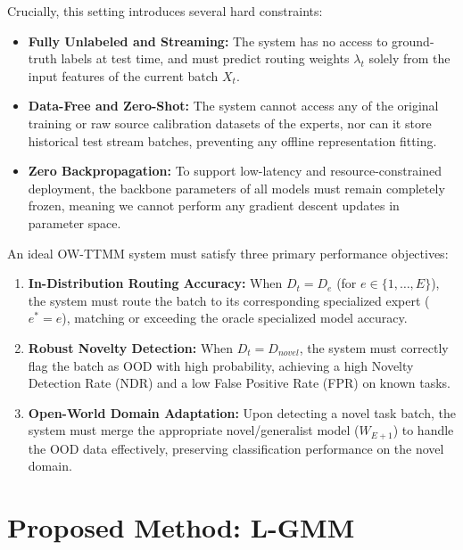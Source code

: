 \documentclass{article}
\theoremstyle{plain}
\theoremstyle{definition}
\theoremstyle{remark}
\begin{document}
Crucially, this setting introduces several hard constraints:
\begin{itemize}\itemsep=0pt \parsep=0pt \vspace{-3pt}
    \item \textbf{Fully Unlabeled and Streaming:} The system has no access to ground-truth labels at test time, and must predict routing weights $\lambda_t$ solely from the input features of the current batch $X_t$.
    \item \textbf{Data-Free and Zero-Shot:} The system cannot access any of the original training or raw source calibration datasets of the experts, nor can it store historical test stream batches, preventing any offline representation fitting.
    \item \textbf{Zero Backpropagation:} To support low-latency and resource-constrained deployment, the backbone parameters of all models must remain completely frozen, meaning we cannot perform any gradient descent updates in parameter space.
\end{itemize}\vspace{-3pt}

An ideal OW-TTMM system must satisfy three primary performance objectives:
\begin{enumerate}\itemsep=0pt \parsep=0pt \vspace{-3pt}
    \item \textbf{In-Distribution Routing Accuracy:} When $D_t = D_e$ (for $e \in \{1,\dots,E\}$), the system must route the batch to its corresponding specialized expert ($e^* = e$), matching or exceeding the oracle specialized model accuracy.
    \item \textbf{Robust Novelty Detection:} When $D_t = D_{novel}$, the system must correctly flag the batch as OOD with high probability, achieving a high Novelty Detection Rate (NDR) and a low False Positive Rate (FPR) on known tasks.
    \item \textbf{Open-World Domain Adaptation:} Upon detecting a novel task batch, the system must merge the appropriate novel/generalist model ($W_{E+1}$) to handle the OOD data effectively, preserving classification performance on the novel domain.
\end{enumerate}\vspace{-3pt}

\section{Proposed Method: L-GMM}
\label{sec:method}
\end{document}
